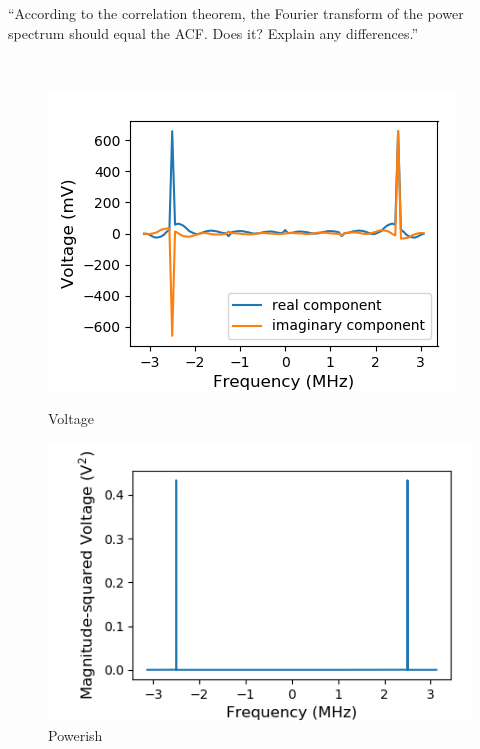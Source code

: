 \documentclass[a4paper]{article}
\begin{document}
``According to the correlation theorem, the Fourier transform of the power spectrum should equal the ACF. Does it? Explain any differences.''

\

\begin{figure}
\centering
\begin{minipage}{.5\textwidth}
	\centering
	\includegraphics[width=.8\linewidth]{5-3/volt1}
	\caption{Voltage}
	\label{fig:Volt1}
\end{minipage}%
\begin{minipage}{.5\textwidth}
	\centering
	\includegraphics[width=.8\linewidth]{5-3/pow1}
	\caption{Powerish}
	\label{fig:SyPw1}
\end{minipage}
\end{figure}
\end{document}
